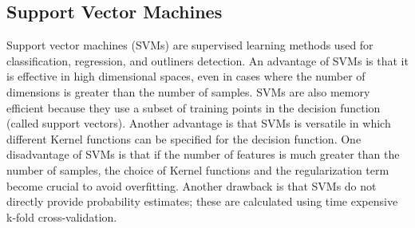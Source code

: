 \documentclass[11pt]{article}
\begin{document}
	
	\subsection{Support Vector Machines}
	Support vector machines (SVMs) are supervised learning methods used for classification, regression, and outliners detection.
	\medbreak
	An advantage of SVMs is that it is effective in high dimensional spaces, even in cases where the number of dimensions is greater than the number of samples. SVMs are also memory efficient because they use a subset of training points in the decision function (called support vectors). Another advantage is that SVMs is versatile in which different Kernel functions can be specified for the decision function.
	One disadvantage of SVMs is that if the number of features is much greater than the number of samples, the choice of Kernel functions and the regularization term become crucial to avoid overfitting. Another drawback is that SVMs do not directly provide probability estimates; these are calculated using time expensive k-fold cross-validation.
	\medbreak
%	
\end{document}
